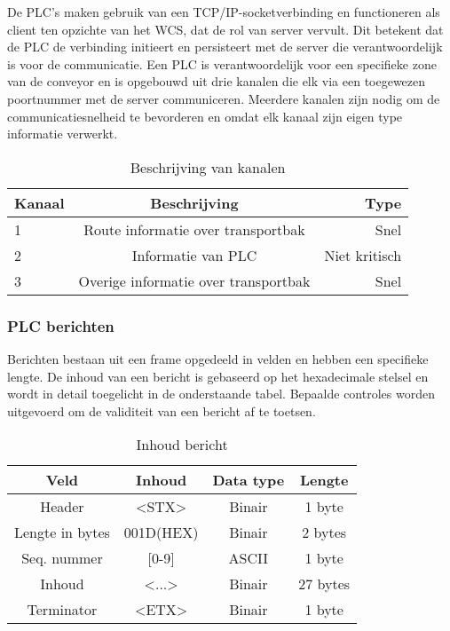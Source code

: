 De PLC's maken gebruik van een TCP/IP-socketverbinding en functioneren als client ten opzichte van het WCS, dat de rol van server vervult. 
Dit betekent dat de PLC de verbinding initieert en persisteert met de server die verantwoordelijk is voor de communicatie.
Een PLC is verantwoordelijk voor een specifieke zone van de conveyor en is opgebouwd uit drie kanalen die elk via een toegewezen poortnummer met de server communiceren. 
Meerdere kanalen zijn nodig om de communicatiesnelheid te bevorderen en omdat elk kanaal zijn eigen type informatie verwerkt.

\begin{table}[!h]
    \centering
    \begin{tabular}{lcr}
      \toprule
      \textbf{Kanaal} & \textbf{Beschrijving} & \textbf{Type}                \\
      \midrule
      1                & Route informatie over transportbak          & Snel           \\
      2                & Informatie van PLC                          & Niet kritisch  \\
      3                & Overige informatie over transportbak        & Snel           \\
      \bottomrule
    \end{tabular}
    \caption[Channel assignment]{\label{tab:channel-assignment}Beschrijving van kanalen}
  \end{table}

\subsubsection{PLC berichten}
Berichten bestaan uit een frame opgedeeld in velden en hebben een specifieke lengte.
De inhoud van een bericht is gebaseerd op het hexadecimale stelsel en wordt in detail toegelicht in de onderstaande tabel.
Bepaalde controles worden uitgevoerd om de validiteit van een bericht af te toetsen. 

\begin{table}[h!]
  \centering 
  \begin{tabular}{|c|c|c|c|}
    \hline
    \textbf{Veld} & \textbf{Inhoud} & \textbf{Data type} & \textbf{Lengte} \\
    \hline 
    Header & <STX> & Binair & 1 byte \\
    \hline 
    Lengte in bytes & 001D(HEX) & Binair & 2 bytes \\
    \hline 
    Seq. nummer &  [0-9] & ASCII & 1 byte  \\
    \hline 
    Inhoud & <...> & Binair & 27 bytes \\
    \hline 
    Terminator & <ETX> & Binair & 1 byte \\
    \hline
  \end{tabular}
  \caption[Message content]{\label{tab:message-content}Inhoud bericht}
\end{table}


